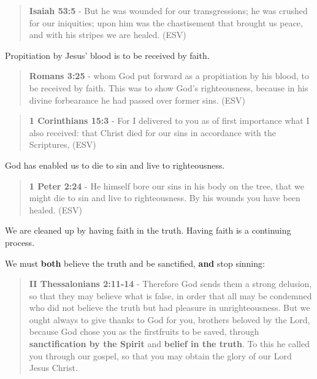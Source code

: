 \documentclass[11pt]{article}
\begin{document}
\begin{quote}
\textbf{Isaiah 53:5} -  But he was wounded for our transgressions; he was crushed for our iniquities; upon him was the chastisement that brought us peace, and with his stripes we are healed.  (ESV)
\end{quote}

Propitiation by Jesus' blood is to be received by faith.

\begin{quote}
\textbf{Romans 3:25} -  whom God put forward as a propitiation by his blood, to be received by faith.  This was to show God's righteousness, because in his divine forbearance he had passed over former sins.  (ESV)
\end{quote}

\begin{quote}
\textbf{1 Corinthians 15:3} -  For I delivered to you as of first importance what I also received: that Christ died for our sins in accordance with the Scriptures,  (ESV)
\end{quote}

God has enabled us to die to sin and live to righteousness.

\begin{quote}
\textbf{1 Peter 2:24} -  He himself bore our sins in his body on the tree, that we might die to sin and live to righteousness.  By his wounds you have been healed.  (ESV)
\end{quote}

We are cleaned up by having faith in the truth. Having faith is a continuing process.

We must \textbf{both} believe the truth and be sanctified, \textbf{and} stop sinning:

\begin{quote}
\textbf{II Thessalonians 2:11-14} - Therefore God sends them a strong delusion, so that they may believe what is false, in order that all may be condemned who did not believe the truth but had pleasure in unrighteousness. But we ought always to give thanks to God for you, brothers beloved by the Lord, because God chose you as the firstfruits to be saved, through \textbf{sanctification by the Spirit} and \textbf{belief in the truth}. To this he called you through our gospel, so that you may obtain the glory of our Lord Jesus Christ.
\end{quote}
\end{document}
